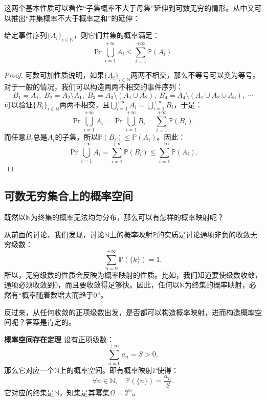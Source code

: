 \documentclass[12pt,UTF8,fontset=none]{ctexbook}
\begin{document}
这两个基本性质可以看作“子集概率不大于母集”延伸到可数无穷的情形。从中又可以推出“并集概率不大于概率之和”的延伸：
\begin{tm}
    给定事件序列$\{A_i\}_{i\in\mathbb{N}}$，则它们并集的概率满足：
    $$ \Pr{\bigcup_{i=1}^{+\infty} A_i} \leqslant \sum_{i=1}^{+\infty} \mathbb{P}(A_i). $$
\end{tm}

\begin{proof}
    可数可加性质说明，如果$\{A_i\}_{i\in\mathbb{N}}$两两不相交，那么不等号可以变为等号。对于一般的情况，我们可以构造两两不相交的事件序列：
    $$ B_1 = A_1, \; B_2 = A_2\setminus A_1, \; B_3 = A_3\setminus (A_1 \cup A_2), \; B_4 = A_4\setminus (A_1 \cup A_2 \cup A_3), \; \cdots$$
    可以验证$\{B_i\}_{i\in\mathbb{N}}$两两不相交，且$\bigcup_{i=1}^{+\infty} A_i = \bigcup_{i=1}^{+\infty} B_i$，于是：
    $$  \Pr{\bigcup_{i=1}^{+\infty} A_i} = \Pr{\bigcup_{i=1}^{+\infty} B_i} = \sum_{i=1}^{+\infty} \mathbb{P}(B_i). $$
    而任意$B_i$总是$A_i$的子集，所以$\mathbb{P}(B_i)\leqslant \mathbb{P}(A_i)$。因此：
    $$ \Pr{\bigcup_{i=1}^{+\infty} A_i} = \sum_{i=1}^{+\infty} \mathbb{P}(B_i) \leqslant \sum_{i=1}^{+\infty} \mathbb{P}(A_i). $$
\end{proof}

\subsection{可数无穷集合上的概率空间}

既然以$\mathbb{N}$为终集的概率无法均匀分布，那么可以有怎样的概率映射呢？

从前面的讨论，我们发现，讨论$\mathbb{N}$上的概率映射$\mathbb{P}$的实质是讨论通项非负的收敛无穷级数：
$$ \sum_{n=0}^{+\infty} \mathbb{P}(\{k\}) = 1. $$
所以，无穷级数的性质会反映为概率映射的性质。比如，我们知道要使级数收敛，通项必须收敛到$0$，而且要收敛得足够快。因此，任何以$\mathbb{N}$为终集的概率映射，必然有“概率随着数增大而趋于$0$”。

反过来，从任何收敛的正项级数出发，是否都可以构造概率映射，进而构造概率空间呢？答案是肯定的。
\begin{tm}{\textbf{概率空间存在定理}}
    设有正项级数：
    $$ \sum_{n=0}^{+\infty} a_n = S > 0,$$
    那么它对应一个$\mathbb{N}$上的概率空间。即有概率映射$\mathbb{P}$使得：
    $$ \forall n\in\mathbb{N},\quad \mathbb{P}(\{n\}) = \frac{a_n}{S}.$$
    它对应的终集是$\mathbb{N}$，知集是其幂集$\Omega = 2^{\mathbb{N}}$。
\end{tm}
\end{document}
